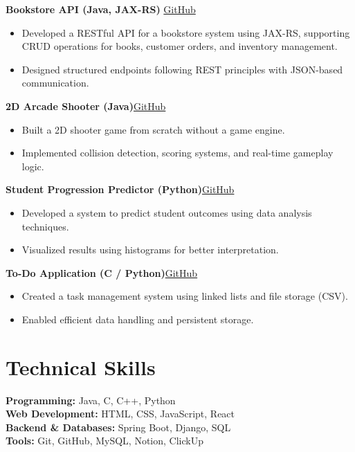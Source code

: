 \documentclass[a4paper,10pt]{article}
\begin{document}
\textbf{Bookstore API (Java, JAX-RS)} \hfill \href{https://github.com/Senaath-Suraweera/BookStoreAPI}{GitHub}
\begin{itemize}
    \item Developed a RESTful API for a bookstore system using JAX-RS, supporting CRUD operations for books, customer orders, and inventory management.
    \item Designed structured endpoints following REST principles with JSON-based communication.
\end{itemize}

\textbf{2D Arcade Shooter (Java)}\hfill \href{https://github.com/Senaath-Suraweera/Shooter.git}{GitHub}
\begin{itemize}
    \item Built a 2D shooter game from scratch without a game engine.
    \item Implemented collision detection, scoring systems, and real-time gameplay logic.
\end{itemize}

\textbf{Student Progression Predictor (Python)}\hfill \href{https://github.com/Senaath-Suraweera/Progression-Report-Script.git}{GitHub}
\begin{itemize}
    \item Developed a system to predict student outcomes using data analysis techniques.
    \item Visualized results using histograms for better interpretation.
\end{itemize}

\textbf{To-Do Application (C / Python)}\hfill \href{https://github.com/Senaath-Suraweera/Todo-List.git}{GitHub}
\begin{itemize}
    \item Created a task management system using linked lists and file storage (CSV).
    \item Enabled efficient data handling and persistent storage.
\end{itemize}

\section*{Technical Skills}

\textbf{Programming:} Java, C, C++, Python \\
\textbf{Web Development:} HTML, CSS, JavaScript, React \\
\textbf{Backend \& Databases:} Spring Boot, Django, SQL \\
\textbf{Tools:} Git, GitHub, MySQL, Notion, ClickUp
\end{document}
